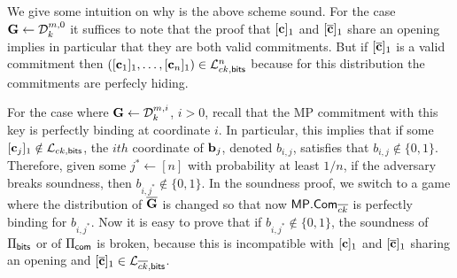 We give some intuition on why is the above scheme sound. For the case $\mathbf{{G}} \gets \mathcal{D}_k^{m,0}$ it suffices to note that the proof that  $[\mathbf{c}]_1$ and $[{\overline{\mathbf{c}}}]_1$ share an opening implies in particular that they are both valid commitments. But if 
$[{\overline{\mathbf{c}}}]_1$ is a valid commitment then $([\mathbf{c}_1]_1,\ldots, [\mathbf{c}_n]_1) \in \mathcal{L}_{ck,\mathsf{bits}}^n$ because for this distribution the commitments are perfecly hiding. 

For the case where $\mathbf{{G}} \gets \mathcal{D}_k^{m,i}$, $i>0$, 
recall that the MP commitment with this key is 
perfectly binding at coordinate $i$. In particular, this implies that if some $[\mathbf{c}_j]_1 \notin \mathcal{L}_{ck,\mathsf{bits}}$, the $ith$ coordinate of $\mathbf{b}_j$, denoted $b_{i,j}$, satisfies that $b_{i,j} \notin \{0,1\}$. Therefore, given some $j^* \gets [n]$ with probability at least $1/n$, if the adversary breaks soundness, then $b_{i,j^*} \notin \{0,1\}$. In the soundness proof, we switch to a game where the distribution of $\overline{\mathbf{{G}}}$ is changed so that now 
$\mathsf{MP}.\mathsf{Com}_{\overline{ck}}$ is perfectly binding for $b_{i,j^*}$. Now it is easy to prove that if $b_{i,j^*} \notin \{0,1\}$, the soundness of $\Pi_{\mathsf{bits}}$ or of $\Pi_{\mathsf{com}}$ is broken, because this is incompatible with $[\mathbf{c}]_1$ and $[{\overline{\mathbf{c}}}]_1$ sharing an opening and $[{\overline{\mathbf{c}}}]_1 \in\mathcal{L}_{\overline{ck},\mathsf{bits}}$.

